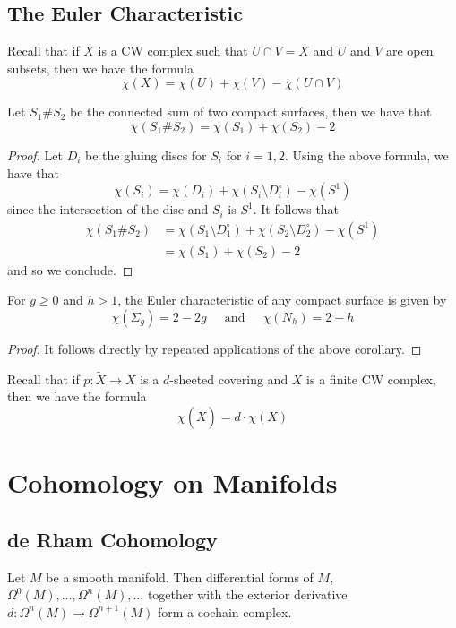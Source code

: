 \documentclass[a4paper]{article}
\begin{document}
\subsection{The Euler Characteristic}
Recall that if $X$ is a CW complex such that $U\cap V=X$ and $U$ and $V$ are open subsets, then we have the formula $$\chi(X)=\chi(U)+\chi(V)-\chi(U\cap V)$$

\begin{crl}{}{} Let $S_1\# S_2$ be the connected sum of two compact surfaces, then we have that $$\chi(S_1\# S_2)=\chi(S_1)+\chi(S_2)-2$$ \tcbline
\begin{proof}
Let $D_i$ be the gluing discs for $S_i$ for $i=1,2$. Using the above formula, we have that $$\chi(S_i)=\chi(D_i)+\chi(S_i\setminus D_i^\circ)-\chi(S^1)$$ since the intersection of the disc and $S_i$ is $S^1$. It follows that 
\begin{align*}
\chi(S_1\# S_2)&=\chi(S_1\setminus D_1^\circ)+\chi(S_2\setminus D_2^\circ)-\chi(S^1)\\
&=\chi(S_1)+\chi(S_2)-2
\end{align*}
and so we conclude. 
\end{proof}
\end{crl}

\begin{crl}{}{} For $g\geq 0$ and $h>1$, the Euler characteristic of any compact surface is given by $$\chi(\Sigma_g)=2-2g\;\;\;\;\text{ and }\;\;\;\;\chi(N_h)=2-h$$ \tcbline
\begin{proof}
It follows directly by repeated applications of the above corollary. 
\end{proof}
\end{crl}

Recall that if $p:\tilde{X}\to X$ is a $d$-sheeted covering and $X$ is a finite CW complex, then we have the formula $$\chi(\tilde{X})=d\cdot\chi(X)$$


\pagebreak
\section{Cohomology on Manifolds}
\subsection{de Rham Cohomology}
\begin{prp}{}{} Let $M$ be a smooth manifold. Then differential forms of $M$, $\Omega^0(M),\dots,\Omega^n(M),\dots$ together with the exterior derivative $d:\Omega^n(M)\to\Omega^{n+1}(M)$ form a cochain complex. 
\end{prp}
\end{document}
